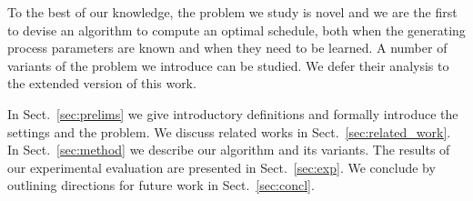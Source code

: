 To the best of our knowledge, the problem we study is novel and we are the first
to devise an algorithm to compute an optimal schedule, both when the generating
process parameters are known and when they need to be learned. A number of variants
of the problem we introduce can be studied. We defer their analysis to the
extended version of this work.

 In Sect.~\ref{sec:prelims} we give introductory
definitions and formally introduce the settings and the problem. We discuss
related works in Sect.~\ref{sec:related_work}. In Sect.~\ref{sec:method} we
describe our algorithm \algoname and its variants. The results of our
experimental evaluation are presented in Sect.~\ref{sec:exp}. We conclude by
outlining directions for future work in Sect.~\ref{sec:concl}.
